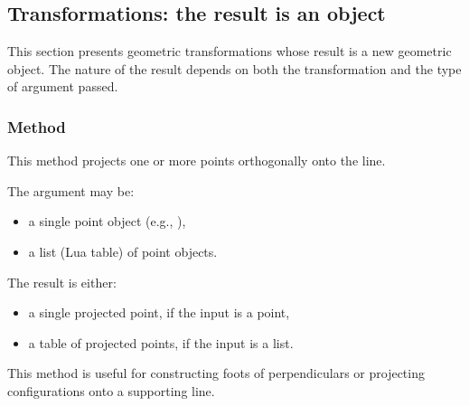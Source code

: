 
\subsection{Transformations: the result is an object} %
\label{sub:the_result_is_an_object}

This section presents geometric transformations whose result is a new geometric object. The nature of the result depends on both the transformation and the type of argument passed.

\subsubsection{Method } %
\label{ssub:example_projection_of_several_points}

This method projects one or more points orthogonally onto the line.

\medskip
\noindent
The argument  may be:
\begin{itemize}
  \item a single point object (e.g., ),
  \item a list (Lua table) of point objects.
\end{itemize}

\noindent
The result is either:
\begin{itemize}
  \item a single projected point, if the input is a point,
  \item a table of projected points, if the input is a list.
\end{itemize}

\medskip
\noindent
This method is useful for constructing foots of perpendiculars or projecting configurations onto a supporting line.

\vspace{1em}

\begin{tkzexample}[latex=.5\textwidth]
\begin{center}
\end{center}
\end{tkzexample}

